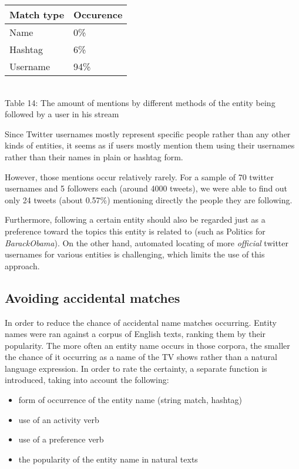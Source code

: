 \begin{center}
  \begin{tabular}{ | p{3cm}| p{2cm} | } \hline
    Match type & Occurence \\ \hline
    Name & 0\% \\ \hline
    Hashtag & 6\% \\ \hline
    Username & 94\% \\ \hline
  \end{tabular} \\
  Table 14: The amount of mentions by different methods of the entity being followed by a user in his stream \\
\end{center}

Since Twitter usernames mostly represent specific people rather than any other kinds of entities, it seems as if users mostly
mention them using their usernames rather than their names in plain or hashtag form.

However, those mentions occur relatively rarely. For a sample of 70 twitter usernames and 5 followers each
(around 4000 tweets), we were able to find out only 24 tweets (about 0.57\%) mentioning directly the people they are following.

Furthermore, following a certain entity should also be regarded just as a preference toward the topics this entity is related to (such as Politics for \textit{BarackObama}). On the other hand, automated locating of more \textit{official} twitter usernames for various entities is challenging, which
limits the use of this approach.

\subsection{Avoiding accidental matches}
In order to reduce the chance of accidental name matches occurring. Entity names were ran against a corpus of English texts,
ranking them by their popularity. The more often an entity name occurs in those corpora, the smaller the chance of it occurring as a name of the TV shows rather than a natural language expression. In order to rate the certainty, a separate function is introduced, taking into account the following:

\begin{itemize}
  \item form of occurrence of the entity name (string match, hashtag)
  \item use of an activity verb
  \item use of a preference verb
  \item the popularity of the entity name in natural texts
\end{itemize}

